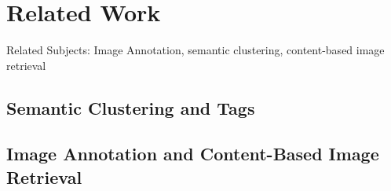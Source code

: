 %
\section{Related Work}
\label{sec_relatedwork}

Related Subjects: Image Annotation, semantic clustering, content-based image retrieval

\subsection{Semantic Clustering and Tags}

\subsection{Image Annotation and Content-Based Image Retrieval}

